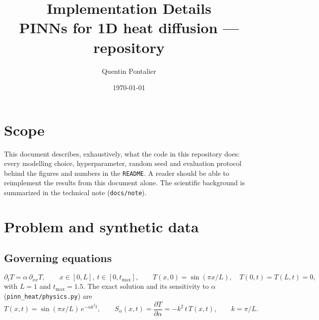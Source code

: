 \documentclass[10pt]{article}
\title{\textbf{Implementation Details}\\[2pt]\large PINNs for 1D heat diffusion --- repository \code{pinn-heat-diffusion\_1D}}
\author{Quentin Pontalier}
\date{\today}
\newcommand{\code}[1]{\texttt{#1}}
\begin{document}
\maketitle
\tableofcontents

\section{Scope}
This document describes, exhaustively, what the code in this repository does: every modelling choice, hyperparameter, random seed and evaluation protocol behind the figures and numbers in the \code{README}. A reader should be able to reimplement the results from this document alone. The scientific background is summarized in the technical note (\code{docs/note}).

\section{Problem and synthetic data}

\subsection{Governing equations}
\begin{equation}
\partial_t T = \alpha\,\partial_{xx}T,\qquad x\in[0,L],\ t\in[0,t_{\max}],\qquad
T(x,0)=\sin(\pi x/L),\quad T(0,t)=T(L,t)=0,
\end{equation}
with $L=1$ and $t_{\max}=1.5$. The exact solution and its sensitivity to $\alpha$ (\code{pinn\_heat/physics.py}) are
\begin{equation}
T(x,t)=\sin(\pi x/L)\,e^{-\alpha k^2 t},\qquad
S_\alpha(x,t)=\frac{\partial T}{\partial\alpha}=-k^2\,t\,T(x,t),\qquad k=\pi/L .
\end{equation}
\end{document}
